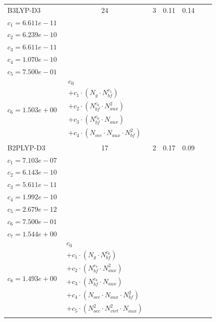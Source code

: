 \begin{longtable}{|l|c|c|c|c|p{3.2cm}|p{5.0cm}|}
B3LYP-D3 & 24 & 3 & 0.11 & 0.14 & \begin{tabular}{l}\(c_{0}=5.141e-11\) \\ \(c_{1}=6.611e-11\) \\ \(c_{2}=6.239e-10\) \\ \(c_{3}=6.611e-11\) \\ \(c_{4}=1.070e-10\) \\ \(c_{5}=7.500e-01\) \\ \(c_{6}=1.503e+00\)\end{tabular} & $\begin{array}{l}c_{0} \\ + c_{1}  \cdot  (N_{g}  \cdot  N_{bf} ^{c_{5}}) \\ + c_{2}  \cdot  (N_{bf} ^{c_{6}}  \cdot  N_{aux}^{2}) \\ + c_{3}  \cdot  (N_{bf} ^{c_{6}}  \cdot  N_{aux}) \\ + c_{4}  \cdot  (N_{occ}  \cdot  N_{aux}  \cdot  N_{bf} ^{2})\end{array}$ \\ 
\hline
B2PLYP-D3 & 17 & 2 & 0.17 & 0.09 & \begin{tabular}{l}\(c_{0}=6.621e-01\) \\ \(c_{1}=7.103e-07\) \\ \(c_{2}=6.143e-10\) \\ \(c_{3}=5.611e-11\) \\ \(c_{4}=1.992e-10\) \\ \(c_{5}=2.679e-12\) \\ \(c_{6}=7.500e-01\) \\ \(c_{7}=1.544e+00\) \\ \(c_{8}=1.493e+00\)\end{tabular} & $\begin{array}{l}c_{0} \\ + c_{1}  \cdot  (N_{g}  \cdot  N_{bf} ^{c_{6}}) \\ + c_{2}  \cdot  (N_{bf} ^{c_{7}}  \cdot  N_{aux} ^{2}) \\ + c_{3}  \cdot  (N_{bf} ^{c_{8}}  \cdot  N_{aux}) \\ + c_{4}  \cdot  (N_{occ}  \cdot  N_{aux}  \cdot  N_{bf} ^{2}) \\ + c_{5}  \cdot  (N_{occ} ^{2}  \cdot  N_{virt} ^{2}  \cdot  N_{aux})\end{array}$ \\ 
\hline
\end{longtable}
